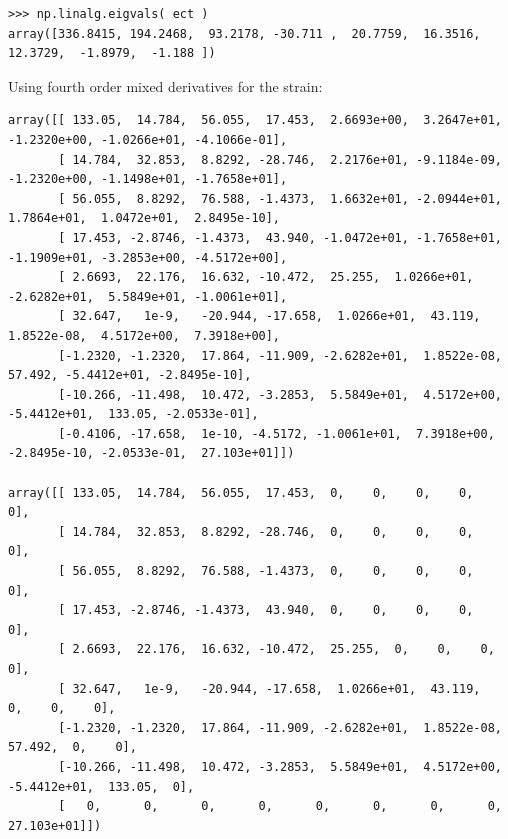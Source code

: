 \documentclass[11pt]{article}
\begin{document}
\begin{enumerate}
\begin{enumerate}
\begin{enumerate}
\begin{verbatim}
>>> np.linalg.eigvals( ect )
array([336.8415, 194.2468,  93.2178, -30.711 ,  20.7759,  16.3516,  12.3729,  -1.8979,  -1.188 ])

\end{verbatim}
Using fourth order mixed derivatives for the strain:
\begin{verbatim}
array([[ 133.05,  14.784,  56.055,  17.453,  2.6693e+00,  3.2647e+01, -1.2320e+00, -1.0266e+01, -4.1066e-01],
       [ 14.784,  32.853,  8.8292, -28.746,  2.2176e+01, -9.1184e-09, -1.2320e+00, -1.1498e+01, -1.7658e+01],
       [ 56.055,  8.8292,  76.588, -1.4373,  1.6632e+01, -2.0944e+01,  1.7864e+01,  1.0472e+01,  2.8495e-10],
       [ 17.453, -2.8746, -1.4373,  43.940, -1.0472e+01, -1.7658e+01, -1.1909e+01, -3.2853e+00, -4.5172e+00],
       [ 2.6693,  22.176,  16.632, -10.472,  25.255,  1.0266e+01, -2.6282e+01,  5.5849e+01, -1.0061e+01],
       [ 32.647,   1e-9,   -20.944, -17.658,  1.0266e+01,  43.119,  1.8522e-08,  4.5172e+00,  7.3918e+00],
       [-1.2320, -1.2320,  17.864, -11.909, -2.6282e+01,  1.8522e-08,  57.492, -5.4412e+01, -2.8495e-10],
       [-10.266, -11.498,  10.472, -3.2853,  5.5849e+01,  4.5172e+00, -5.4412e+01,  133.05, -2.0533e-01],
       [-0.4106, -17.658,  1e-10, -4.5172, -1.0061e+01,  7.3918e+00, -2.8495e-10, -2.0533e-01,  27.103e+01]])

array([[ 133.05,  14.784,  56.055,  17.453,  0,    0,    0,    0,    0],
       [ 14.784,  32.853,  8.8292, -28.746,  0,    0,    0,    0,    0],
       [ 56.055,  8.8292,  76.588, -1.4373,  0,    0,    0,    0,    0],
       [ 17.453, -2.8746, -1.4373,  43.940,  0,    0,    0,    0,    0],
       [ 2.6693,  22.176,  16.632, -10.472,  25.255,  0,    0,    0,    0],
       [ 32.647,   1e-9,   -20.944, -17.658,  1.0266e+01,  43.119,   0,    0,    0],
       [-1.2320, -1.2320,  17.864, -11.909, -2.6282e+01,  1.8522e-08,  57.492,  0,    0],
       [-10.266, -11.498,  10.472, -3.2853,  5.5849e+01,  4.5172e+00, -5.4412e+01,  133.05,  0],
       [   0,      0,      0,      0,      0,      0,      0,      0,     27.103e+01]])


\end{verbatim}
\end{enumerate}
\end{enumerate}
\end{enumerate}
\end{document}
